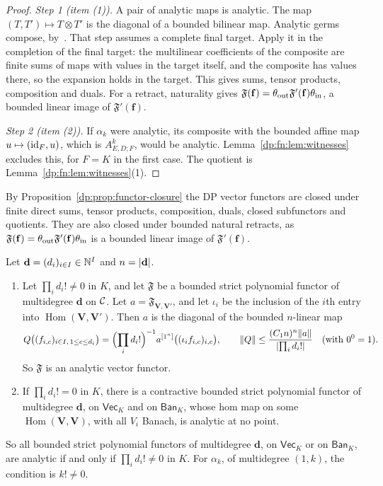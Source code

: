 \begin{proof}
\emph{Step 1 (item (1)).} A pair of analytic maps is analytic. The map $(T,T')\mapsto T\otimes T'$ is the diagonal of a bounded bilinear map. Analytic germs compose, by~\cite[proof of Proposition~14.26, Step~1]{I}. That step assumes a complete final target. Apply it in the completion of the final target: the multilinear coefficients of the composite are finite sums of maps with values in the target itself, and the composite has values there, so the expansion holds in the target. This gives sums, tensor products, composition and duals. For a retract, naturality gives $\mathfrak F(\mathbf f)=\theta_{\rm out}\mathfrak F'(\mathbf f)\theta_{\rm in}$, a bounded linear image of $\mathfrak F'(\mathbf f)$.

\emph{Step 2 (item (2)).} If $\alpha_k$ were analytic, its composite with the bounded affine map $u\mapsto(\mathrm{id}_F,u)$, which is $A^k_{E,D;F}$, would be analytic. Lemma~\ref{dp:fn:lem:witnesses} excludes this, for $F=K$ in the first case. The quotient is Lemma~\ref{dp:fn:lem:witnesses}(1).
\end{proof}

By Proposition~\ref{dp:prop:functor-closure} the DP vector functors are closed under finite direct sums, tensor products, composition, duals, closed subfunctors and quotients. They are also closed under bounded natural retracts, as $\mathfrak F(\mathbf f)=\theta_{\rm out}\mathfrak F'(\mathbf f)\theta_{\rm in}$ is a bounded linear image of $\mathfrak F'(\mathbf f)$.

\begin{theorem}\label{dp:thm:functor-threshold}
Let $\mathbf d=(d_i)_{i\in I}\in\mathbb N^I$ and $n=\lvert \mathbf d\rvert$.
\begin{enumerate}
\item Let $\prod_id_i!\ne0$ in $K$, and let $\mathfrak F$ be a bounded strict polynomial functor of multidegree $\mathbf d$ on $\mathcal{C}$. Let $a=\mathfrak F_{\mathbf V,\mathbf V'}$, and let $\iota_i$ be the inclusion of the $i$th entry into $\operatorname{Hom}(\mathbf V,\mathbf V')$. Then $a$ is the diagonal of the bounded $n$\nobreakdash-linear map
\begin{equation}\label{dp:fn:eq:lift}
 Q\bigl((f_{i,c})_{i\in I,\,1\le c\le d_i}\bigr)=\Bigl(\prod_id_i!\Bigr)^{-1}a^{[1^n]}\bigl((\iota_if_{i,c})_{i,c}\bigr),\qquad
 \lVert Q\rVert\le\frac{(C_1n)^n\lVert a\rVert}{\lvert \prod_id_i!\rvert}\quad(\text{with }0^0=1).
\end{equation}
So $\mathfrak F$ is an analytic vector functor.
\item If $\prod_id_i!=0$ in $K$, there is a contractive bounded strict polynomial functor of multidegree $\mathbf d$, on $\mathsf{Vec}_K$ and on $\mathsf{Ban}_K$, whose hom map on some $\operatorname{Hom}(\mathbf V,\mathbf V)$, with all $V_i$ Banach, is analytic at no point.
\end{enumerate}
So all bounded strict polynomial functors of multidegree $\mathbf d$, on $\mathsf{Vec}_K$ or on $\mathsf{Ban}_K$, are analytic if and only if $\prod_id_i!\ne0$ in $K$. For $\alpha_k$, of multidegree $(1,k)$, the condition is $k!\ne0$.
\end{theorem}

